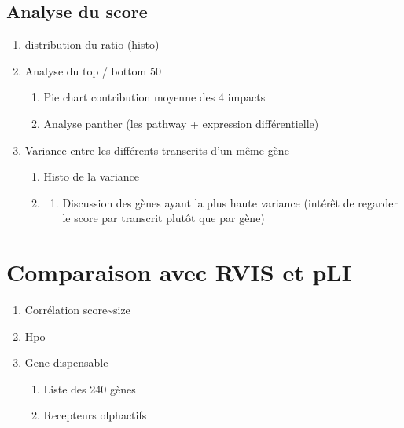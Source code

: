 \documentclass[12pt,twoside]{reedthesis}
\providecommand{\tightlist}{%
  \setlength{\itemsep}{0pt}\setlength{\parskip}{0pt}}
\theoremstyle{definition}
\theoremstyle{definition}
\theoremstyle{remark}
\begin{document}
  \subsection{Analyse du score}\label{analyse-du-score}
  
  \begin{enumerate}
  \def\labelenumi{\arabic{enumi}.}
  \item
    distribution du ratio (histo)
  \item
    Analyse du top / bottom 50
  
    \begin{enumerate}
    \def\labelenumii{\alph{enumii}.}
    \tightlist
    \item
      Pie chart contribution moyenne des 4 impacts\\
    \item
      Analyse panther (les pathway + expression différentielle)
    \end{enumerate}
  \item
    Variance entre les différents transcrits d'un même gène
  
    \begin{enumerate}
    \def\labelenumii{\alph{enumii}.}
    \item
      Histo de la variance\\
    \item
      \begin{enumerate}
      \def\labelenumiii{\alph{enumiii}.}
      \setcounter{enumiii}{1}
      \tightlist
      \item
        Discussion des gènes ayant la plus haute variance (intérêt de
        regarder le score par transcrit plutôt que par gène)
      \end{enumerate}
    \end{enumerate}
  \end{enumerate}
  
  \section{Comparaison avec RVIS et
  pLI}\label{comparaison-avec-rvis-et-pli}
  
  \begin{enumerate}
  \def\labelenumi{\arabic{enumi}.}
  \tightlist
  \item
    Corrélation score\textasciitilde{}size\\
  \item
    Hpo\\
  \item
    Gene dispensable
  
    \begin{enumerate}
    \def\labelenumii{\alph{enumii}.}
    \tightlist
    \item
      Liste des 240 gènes\\
    \item
      Recepteurs olphactifs
    \end{enumerate}
  \end{enumerate}
  
\end{document}
